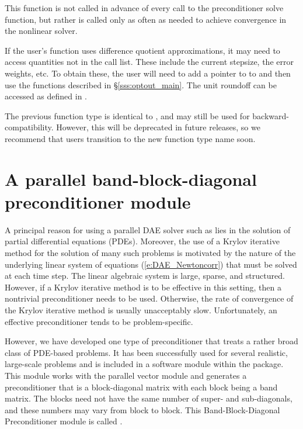 {{  This function is not called in advance of every call to the preconditioner solve
  function, but rather is called only as often as needed to achieve convergence in
  the nonlinear solver.

  If the user's  function uses difference quotient
  approximations, it may need to access quantities not in the call
  list. These include the current stepsize, the error weights, etc.
  To obtain these, the user will need to add a pointer to 
  to  and then use the  functions described in
  \S\ref{sss:optout_main}. The unit roundoff can be accessed as
   defined in .

  The previous function type  is identical to
  , and may still be used for backward-compatibility.
  However, this will be deprecated in future releases, so we recommend
  that users transition to the new function type name soon.
}


\section{A parallel band-block-diagonal preconditioner module}\label{sss:idabbdpre}

A principal reason for using a parallel DAE solver such as {\ida} lies
in the solution of partial differential equations (PDEs).  Moreover,
the use of a Krylov iterative method for the solution of many such
problems is motivated by the nature of the underlying linear system of
equations (\ref{e:DAE_Newtoncorr}) that must be solved at each time step.  The
linear algebraic system is large, sparse, and structured. However, if
a Krylov iterative method is to be effective in this setting, then a
nontrivial preconditioner needs to be used.  Otherwise, the rate of
convergence of the Krylov iterative method is usually unacceptably
slow.  Unfortunately, an effective preconditioner tends to be
problem-specific.

However, we have developed one type of preconditioner that treats a
rather broad class of PDE-based problems.  It has been successfully
used for several realistic, large-scale problems \cite{HiTa:98} and is
included in a software module within the {\ida} package. This module
works with the parallel vector module {\nvecp} and
generates a preconditioner that is a block-diagonal matrix with each
block being a band matrix. The blocks need not have the same number of
super- and sub-diagonals, and these numbers may vary from block to
block. This Band-Block-Diagonal Preconditioner module is called
{\idabbdpre}.

}
